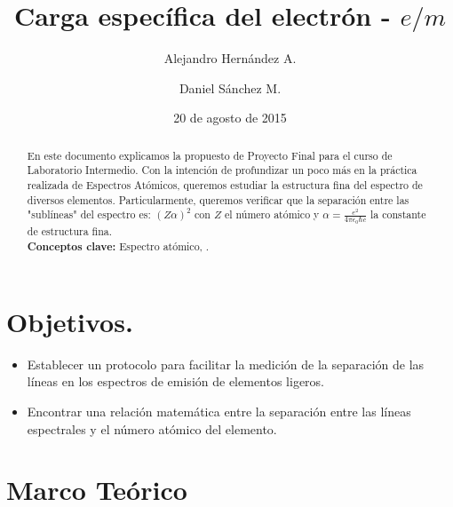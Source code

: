 \documentclass[prb,aps,twocolumn,preprintnumbers,amsmath,amssymb]{revtex4}
\begin{document}
\title{Carga específica del electrón - $e/m$}%

\author{Alejandro Hernández A.}%
\author{Daniel Sánchez M.}%
%
\date{20 de agosto de 2015\\}%

\begin{abstract}
En este documento explicamos la propuesto de Proyecto Final para el curso de Laboratorio Intermedio. Con la intención de profundizar un poco más en la práctica realizada de Espectros Atómicos, queremos estudiar la estructura fina del espectro de diversos elementos. Particularmente, queremos verificar que la separación entre las "sublíneas" del espectro es: $(Z\alpha)^2$ con $Z$ el número atómico y $\alpha = \frac{e^2}{4\pi \epsilon_{0} \hbar c}$ la constante de estructura fina.
\\


\noindent \textbf{Conceptos clave:} Espectro atómico, .
\end{abstract}
                             
\maketitle

\section{\label{sec:intro} Objetivos.}

\begin{itemize}
	\item Establecer un protocolo para facilitar la medición de la separación de las líneas en los espectros de emisión de elementos ligeros.
	
	\item Encontrar una relación matemática entre la separación entre las líneas espectrales y el número atómico del elemento.
\end{itemize}


\section{Marco Teórico}
\end{document}
